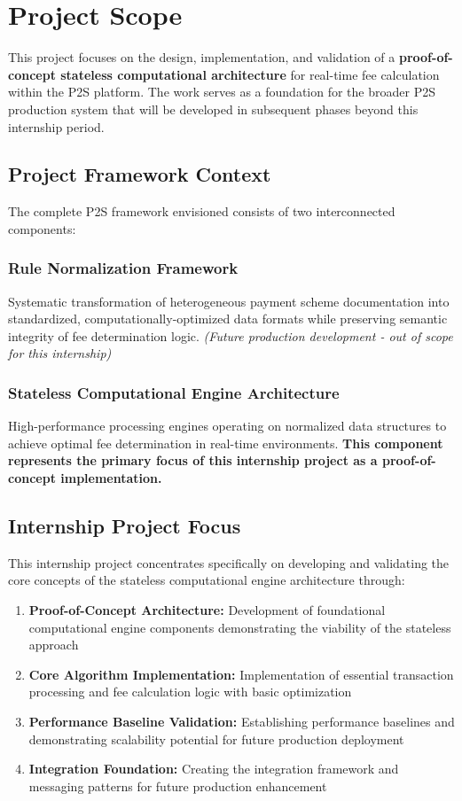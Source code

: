 \section{Project Scope}

This project focuses on the design, implementation, and validation of a \textbf{proof-of-concept stateless computational architecture} for real-time fee calculation within the P2S platform. The work serves as a foundation for the broader P2S production system that will be developed in subsequent phases beyond this internship period.

\subsection{Project Framework Context}

The complete P2S framework envisioned consists of two interconnected components:

\subsubsection{Rule Normalization Framework}
Systematic transformation of heterogeneous payment scheme documentation into standardized, computationally-optimized data formats while preserving semantic integrity of fee determination logic. \textit{(Future production development - out of scope for this internship)}

\subsubsection{Stateless Computational Engine Architecture}
High-performance processing engines operating on normalized data structures to achieve optimal fee determination in real-time environments. \textbf{This component represents the primary focus of this internship project as a proof-of-concept implementation.}

\subsection{Internship Project Focus}

This internship project concentrates specifically on developing and validating the core concepts of the stateless computational engine architecture through:

\begin{enumerate}
    \item \textbf{Proof-of-Concept Architecture:} Development of foundational computational engine components demonstrating the viability of the stateless approach
    \item \textbf{Core Algorithm Implementation:} Implementation of essential transaction processing and fee calculation logic with basic optimization
    \item \textbf{Performance Baseline Validation:} Establishing performance baselines and demonstrating scalability potential for future production deployment
    \item \textbf{Integration Foundation:} Creating the integration framework and messaging patterns for future production enhancement
\end{enumerate}

